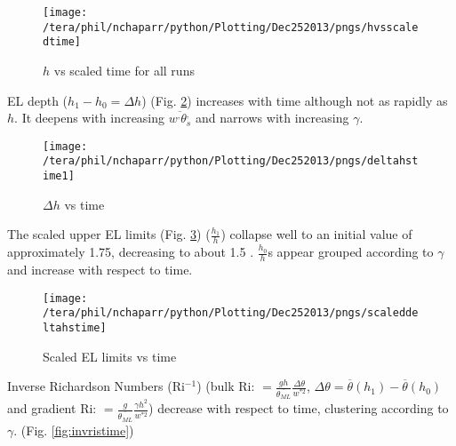 \begin{figure}[htbp]
    \centering
    \texttt{[image: /tera/phil/nchaparr/python/Plotting/Dec252013/pngs/hvsscaledtime]}
    \caption{$h$ vs scaled time for all runs}
    \label{fig:hvsscaledtime}   %
\end{figure}


EL depth ($h_{1}-h_{0}=\Delta h$) (Fig. \ref{fig:deltahvstime1}) increases with time
although not as rapidly as $h$.  It deepens with increasing $\overline{w^{,}\theta^{,}_{s}}$ 
and narrows with increasing $\gamma$. \\

\begin{figure}[htbp]
    \centering
    \texttt{[image: /tera/phil/nchaparr/python/Plotting/Dec252013/pngs/deltahstime1]}
    \caption{$\Delta h$ vs time}
    \label{fig:deltahvstime1}   %
\end{figure}

The scaled upper EL limits (Fig. \ref{fig:scaleddeltahstime}) ($\frac{h_{1}}{h}$) collapse well 
to an initial value of approximately 1.75, decreasing to about 1.5 .  $\frac{h_{0}}{h}$s appear 
grouped according to $\gamma$ and increase with respect to time.\\  


\begin{figure}[htbp]
    \centering
    \texttt{[image: /tera/phil/nchaparr/python/Plotting/Dec252013/pngs/scaleddeltahstime]}
    \caption{Scaled EL limits vs time}
    \label{fig:scaleddeltahstime}   %
\end{figure}

Inverse Richardson Numbers (\acs{Ri}$^{-1}$) (bulk \acs{Ri}: $=\frac{gh}{\overline{\theta_{ML}}} \frac{\Delta \theta}{w^{*2}}$, $\Delta \theta = \overline{\theta}(h_{1})-\overline{\theta}(h_{0})$ 
and gradient \acs{Ri}: $=\frac{g}{\overline{\theta_{ML}}} \frac{\gamma h^{2} }{w^{*2}}$) decrease with respect to time, 
clustering according to $\gamma$. (Fig. \ref{fig:invristime})\\

